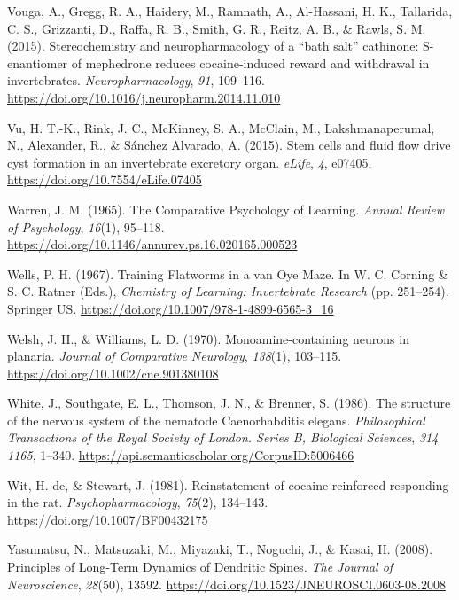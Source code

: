 \documentclass[
  jou,
  floatsintext,
  longtable,
  nolmodern,
  notxfonts,
  notimes,
  donotrepeattitle,
  colorlinks=true,linkcolor=blue,citecolor=blue,urlcolor=blue]{apa7}
\newlength{\cslhangindent}
\newenvironment{CSLReferences}[2] %
 {\begin{list}{}{%
  \setlength{\itemindent}{0pt}
  \setlength{\leftmargin}{0pt}
  \setlength{\parsep}{0pt}
  \ifodd #1
   \setlength{\leftmargin}{\cslhangindent}
   \setlength{\itemindent}{-1\cslhangindent}
  \fi
  \setlength{\itemsep}{#2\baselineskip}}}
 {\end{list}}
\begin{document}
\begin{CSLReferences}{1}{0}
Vouga, A., Gregg, R. A., Haidery, M., Ramnath, A., Al-Hassani, H. K.,
Tallarida, C. S., Grizzanti, D., Raffa, R. B., Smith, G. R., Reitz, A.
B., \& Rawls, S. M. (2015). Stereochemistry and neuropharmacology of a
{``bath salt''} cathinone: {S}-enantiomer of mephedrone reduces
cocaine-induced reward and withdrawal in invertebrates.
\emph{Neuropharmacology}, \emph{91}, 109--116.
\url{https://doi.org/10.1016/j.neuropharm.2014.11.010}

Vu, H. T.-K., Rink, J. C., McKinney, S. A., McClain, M.,
Lakshmanaperumal, N., Alexander, R., \& Sánchez Alvarado, A. (2015).
Stem cells and fluid flow drive cyst formation in an invertebrate
excretory organ. \emph{eLife}, \emph{4}, e07405.
\url{https://doi.org/10.7554/eLife.07405}

Warren, J. M. (1965). The {Comparative} {Psychology} of {Learning}.
\emph{Annual Review of Psychology}, \emph{16}(1), 95--118.
\url{https://doi.org/10.1146/annurev.ps.16.020165.000523}

Wells, P. H. (1967). Training {Flatworms} in a van {Oye} {Maze}. In W.
C. Corning \& S. C. Ratner (Eds.), \emph{Chemistry of {Learning}:
{Invertebrate} {Research}} (pp. 251--254). Springer US.
\url{https://doi.org/10.1007/978-1-4899-6565-3_16}

Welsh, J. H., \& Williams, L. D. (1970). Monoamine-containing neurons in
planaria. \emph{Journal of Comparative Neurology}, \emph{138}(1),
103--115. \url{https://doi.org/10.1002/cne.901380108}

White, J., Southgate, E. L., Thomson, J. N., \& Brenner, S. (1986). The
structure of the nervous system of the nematode {Caenorhabditis}
elegans. \emph{Philosophical Transactions of the Royal Society of
London. Series B, Biological Sciences}, \emph{314 1165}, 1--340.
\url{https://api.semanticscholar.org/CorpusID:5006466}

Wit, H. de, \& Stewart, J. (1981). Reinstatement of cocaine-reinforced
responding in the rat. \emph{Psychopharmacology}, \emph{75}(2),
134--143. \url{https://doi.org/10.1007/BF00432175}

Yasumatsu, N., Matsuzaki, M., Miyazaki, T., Noguchi, J., \& Kasai, H.
(2008). Principles of {Long}-{Term} {Dynamics} of {Dendritic} {Spines}.
\emph{The Journal of Neuroscience}, \emph{28}(50), 13592.
\url{https://doi.org/10.1523/JNEUROSCI.0603-08.2008}

\end{CSLReferences}
\end{document}
